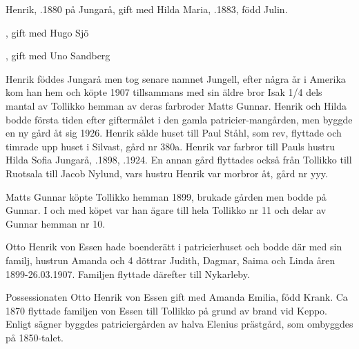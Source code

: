 Henrik, .1880 på Jungarå, gift med Hilda Maria, .1883, född Julin.
\begin{jhchildren}
  \item {}
  \item {}, gift med Hugo Sjö
  \item {}
  \item {}
  \item {}
  \item {}, gift med Uno Sandberg
\end{jhchildren}
Henrik föddes Jungarå men tog senare namnet Jungell, efter några år i Amerika kom han hem och köpte 1907 tillsammans med sin äldre bror Isak 1/4 dels mantal av Tollikko hemman av deras farbroder Matts Gunnar. Henrik och Hilda bodde första tiden efter giftermålet i den gamla patricier-mangården, men byggde en ny gård åt sig 1926. Henrik sålde huset till Paul Ståhl, som rev, flyttade och timrade upp 	huset i Silvast, gård nr 380a. Henrik var farbror till Pauls hustru Hilda Sofia Jungarå, .1898, .1924. En annan gård flyttades också från Tollikko till Ruotsala till Jacob Nylund, vars hustru Henrik var morbror åt, gård nr yyy.




Matts Gunnar köpte Tollikko hemman 1899, brukade gården men bodde på Gunnar. I och med köpet var han ägare till hela Tollikko nr 11 och delar av Gunnar hemman nr 10.


Otto Henrik von Essen hade boenderätt i patricierhuset och bodde där med sin familj, hustrun Amanda och 4 döttrar Judith, Dagmar, Saima och Linda åren 1899-26.03.1907. Familjen flyttade därefter till Nykarleby.

Possessionaten Otto Henrik von Essen gift med Amanda Emilia, född Krank. Ca 1870 flyttade familjen von Essen till Tollikko på grund av brand vid Keppo. Enligt sägner byggdes patriciergården av halva Elenius prästgård, som ombyggdes på 1850-talet.


